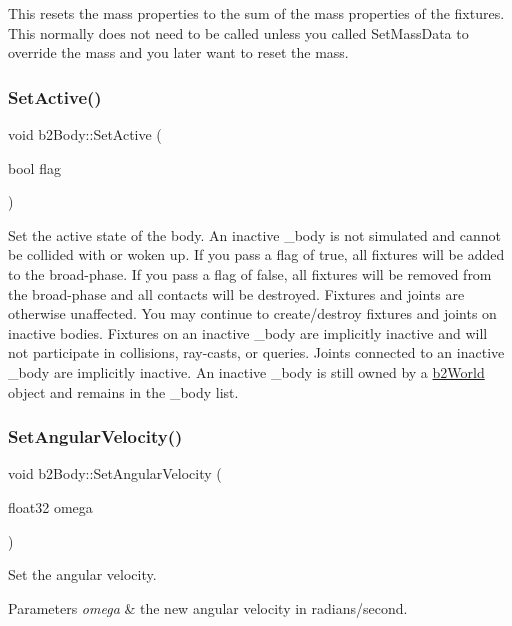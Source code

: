 This resets the mass properties to the sum of the mass properties of the fixtures. This normally does not need to be called unless you called Set\+Mass\+Data to override the mass and you later want to reset the mass. \mbox{\label{classb2Body_ab8059b7b3e3b64aee17b54f68f7dde80}} 
\subsubsection{\texorpdfstring{Set\+Active()}{SetActive()}}
{\footnotesize\ttfamily void b2\+Body\+::\+Set\+Active (\begin{DoxyParamCaption}\item[{bool}]{flag }\end{DoxyParamCaption})}

Set the active state of the body. An inactive _body is not simulated and cannot be collided with or woken up. If you pass a flag of true, all fixtures will be added to the broad-\/phase. If you pass a flag of false, all fixtures will be removed from the broad-\/phase and all contacts will be destroyed. Fixtures and joints are otherwise unaffected. You may continue to create/destroy fixtures and joints on inactive bodies. Fixtures on an inactive _body are implicitly inactive and will not participate in collisions, ray-\/casts, or queries. Joints connected to an inactive _body are implicitly inactive. An inactive _body is still owned by a \mbox{\hyperlink{classb2World}{b2\+World}} object and remains in the _body list. \mbox{\label{classb2Body_a37adc4160b84f73e8552a91cbde3f578}}
\subsubsection{\texorpdfstring{Set\+Angular\+Velocity()}{SetAngularVelocity()}}
{\footnotesize\ttfamily void b2\+Body\+::\+Set\+Angular\+Velocity (\begin{DoxyParamCaption}\item[{float32}]{omega }\end{DoxyParamCaption})\hspace{0.3cm}{\ttfamily [inline]}}

Set the angular velocity. 
\begin{DoxyParams}{Parameters}
{\em omega} & the new angular velocity in radians/second. \\
\hline
\end{DoxyParams}
\mbox{\label{classb2Body_ac72ed3df52a26c33db82252ab57399af}} 
